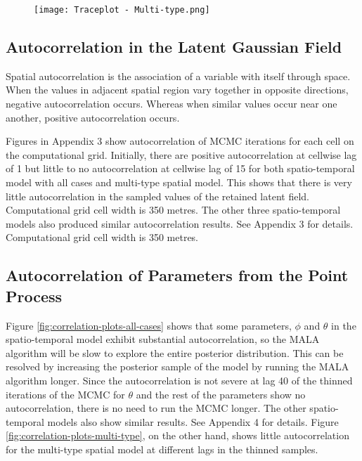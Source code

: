 \begin{figure}[H]
    \begin{center}
        \texttt{[image: Traceplot - Multi-type.png]}
    \end{center}
     \label{fig:trace-plots-multi-type}
\end{figure}

\subsection{Autocorrelation in the Latent Gaussian Field}

Spatial autocorrelation is the association of a variable with itself through space. When the values in adjacent spatial region vary together in opposite directions, negative autocorrelation occurs. Whereas when similar values occur near one another, positive autocorrelation occurs.

Figures in Appendix 3 show autocorrelation of MCMC iterations for each cell on the computational grid. Initially, there are positive autocorrelation at cellwise lag of 1 but little to no autocorrelation at cellwise lag of 15 for both spatio-temporal model with all cases and multi-type spatial model. This shows that there is very little autocorrelation in the sampled values of the retained latent field. Computational grid cell width is 350 metres. The other three spatio-temporal models also produced similar autocorrelation results. See Appendix 3 for details. Computational grid cell width is 350 metres.

\subsection{Autocorrelation of Parameters from the Point Process}

Figure \ref{fig:correlation-plots-all-cases} shows that some parameters, $\phi$ and $\theta$ in the spatio-temporal model exhibit substantial autocorrelation, so the MALA algorithm will be slow to explore the entire posterior distribution. This can be resolved by increasing the posterior sample of the model by running the MALA algorithm longer. Since the autocorrelation is not severe at lag 40 of the thinned iterations of the MCMC for $\theta$ and the rest of the parameters show no autocorrelation, there is no need to run the MCMC longer. The other spatio-temporal models also show similar results. See Appendix 4 for details. Figure \ref{fig:correlation-plots-multi-type}, on the other hand, shows little autocorrelation for the multi-type spatial model at different lags in the thinned samples.


